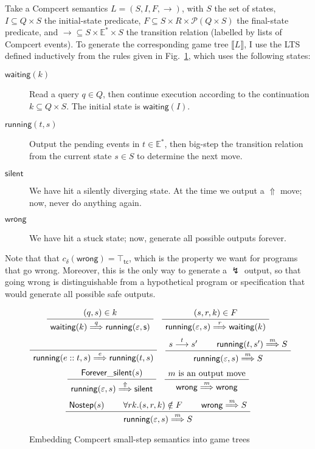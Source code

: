 \documentclass[11pt]{article}
\newcommand{\kw}[1]{{\mathsf{#1}}}
\begin{document}
Take a Compcert semantics $L = (S, I, F, \rightarrow)$,
with $S$ the set of states,
$I \subseteq Q \times S$
the initial-state predicate,
$F \subseteq S \times R \times \mathcal{P}(Q \times S)$
the final-state predicate, and
${\rightarrow} \subseteq S \times \mathbb{E}^* \times S$
the transition relation (labelled by lists of Compcert events).
To generate the corresponding game tree $\llbracket L \rrbracket$,
I use the LTS defined inductively
from the rules given in Fig.~\ref{fig:embed},
which uses the following states:
\begin{description}
\item[$\kw{waiting}(k)$]
  Read a query $q \in Q$,
  then continue execution according to the continuation
  $k \subseteq Q \times S$.
  The initial state is $\kw{waiting}(I)$.
\item[$\kw{running}(t, s)$]
  Output the pending events in $t \in \mathbb{E}^*$,
  then big-step the transition relation from the current state $s \in S$
  to determine the next move.
\item[$\kw{silent}$]
  We have hit a silently diverging state.
  At the time we output a $\Uparrow$ move;
  now, never do anything again.
\item[$\kw{wrong}$]
  We have hit a stuck state;
  now, generate all possible outputs forever.
\end{description}
Note that that $c_\delta(\kw{wrong}) = \top_\kw{tc}$,
which is the property we want for programs that go wrong.
Moreover, this is the only way to generate a $\lightning$ output,
so that going wrong is distinguishable from
a hypothetical program or specification that would
generate all possible safe outputs.

\begin{figure}
\[
  \AxiomC{$(q, s) \in k$}
  \UnaryInfC{$\kw{waiting}(k) \stackrel{q}{\Longrightarrow} \kw{running(\varepsilon, s)}$}
  \DisplayProof
  \quad
  \AxiomC{$(s, r, k) \in F$}
  \UnaryInfC{$\kw{running}(\varepsilon, s) \stackrel{r}{\Longrightarrow} \kw{waiting}(k)$}
  \DisplayProof
\]
\vspace{.5em}
\[
  \AxiomC{\rule[-.3\baselineskip]{0pt}{\baselineskip}}
  \UnaryInfC{$\kw{running}(e::t, s) \stackrel{e}{\Longrightarrow} \kw{running}(t, s)$}
  \DisplayProof
  \quad
  \AxiomC{$s \stackrel{t}{\longrightarrow} s'$}
  \AxiomC{$\kw{running}(t, s') \stackrel{m}{\Longrightarrow} S$}
  \BinaryInfC{$\kw{running}(\varepsilon, s) \stackrel{m}{\Longrightarrow} S$}
  \DisplayProof
\]
\vspace{.5em}
\[
  \AxiomC{$\kw{Forever\_silent}(s)$}
  \UnaryInfC{$\kw{running}(\varepsilon, s) \stackrel{\Uparrow}{\Longrightarrow} \kw{silent}$}
  \DisplayProof
  \quad
  \AxiomC{$m \mbox{ is an output move}$}
  \UnaryInfC{$\kw{wrong} \stackrel{m}{\Longrightarrow} \kw{wrong}$}
  \DisplayProof
\]
\vspace{.5em}
\[
  \AxiomC{$\kw{Nostep}(s)$}
  \AxiomC{$\forall r k . (s, r, k) \notin F$}
  \AxiomC{$\kw{wrong} \stackrel{m}{\Longrightarrow} S$}
  \TrinaryInfC{$\kw{running}(\varepsilon, s) \stackrel{m}{\Longrightarrow} S$}
  \DisplayProof
\]
\caption{Embedding Compcert small-step semantics into game trees}
\label{fig:embed}
\end{figure}
\end{document}
